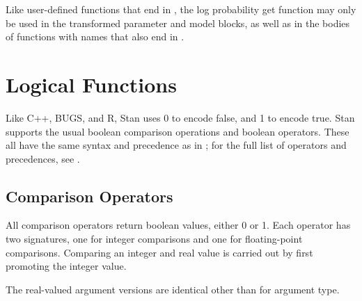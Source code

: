 Like user-defined functions that end in , the log
probability get function may only be used in the transformed parameter
and model blocks, as well as in the bodies of functions with names
that also end in .


\section{Logical Functions}

Like C++, BUGS, and R, Stan uses 0 to encode false, and 1 to encode
true.  Stan supports the usual boolean comparison operations and
boolean operators.  These all have the same syntax and precedence as
in \Cpp; for the full list of operators and precedences, see
.  

\subsection{Comparison Operators}

All comparison operators return boolean values, either 0 or 1.  Each
operator has two signatures, one for integer comparisons and one for
floating-point comparisons.  Comparing an integer and real value is
carried out by first promoting the integer value.
%
\begin{description}
\end{description}
%
The real-valued argument versions are identical other than for
argument type.
%
\begin{description}
\end{description}


